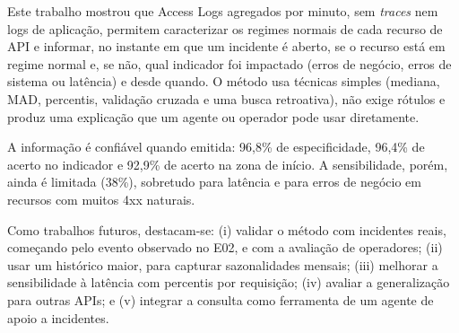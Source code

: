 \documentclass[sigconf,nonacm]{acmart}
\begin{document}
Este trabalho mostrou que Access Logs agregados por minuto, sem \emph{traces} nem logs de aplicação, permitem caracterizar os regimes normais de cada recurso de API e informar, no instante em que um incidente é aberto, se o recurso está em regime normal e, se não, qual indicador foi impactado (erros de negócio, erros de sistema ou latência) e desde quando. O método usa técnicas simples (mediana, MAD, percentis, validação cruzada e uma busca retroativa), não exige rótulos e produz uma explicação que um agente ou operador pode usar diretamente.

A informação é confiável quando emitida: 96,8\% de especificidade, 96,4\% de acerto no indicador e 92,9\% de acerto na zona de início. A sensibilidade, porém, ainda é limitada (38\%), sobretudo para latência e para erros de negócio em recursos com muitos 4xx naturais.

Como trabalhos futuros, destacam-se: (i) validar o método com incidentes reais, começando pelo evento observado no E02, e com a avaliação de operadores; (ii) usar um histórico maior, para capturar sazonalidades mensais; (iii) melhorar a sensibilidade à latência com percentis por requisição; (iv) avaliar a generalização para outras APIs; e (v) integrar a consulta como ferramenta de um agente de apoio a incidentes.



\end{document}
